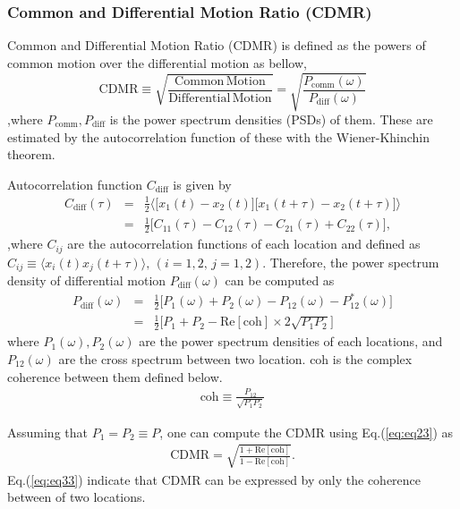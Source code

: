 \documentclass[a4paper,12pt]{book}
\begin{document}
\subsubsection{Common and Differential Motion Ratio (CDMR)}
Common and Differential Motion Ratio (CDMR) is defined as the powers of common motion over the differential motion as bellow,
\begin{equation}
  \mathrm{CDMR} \equiv \sqrt{\frac{\mathrm{Common\,Motion}}{\mathrm{Differential\,Motion}}} = \sqrt{\frac{P_{\mathrm{comm}}(\omega)}{P_{\mathrm{diff}}(\omega)}} \label{eq:eq23}
\end{equation}
,where $P_{\mathrm{comm}},P_{\mathrm{diff}}$ is the power spectrum densities (PSDs) of them. These are estimated by the autocorrelation function of these with the Wiener-Khinchin theorem.

Autocorrelation function $C_{\mathrm{diff}}$ is given by
\begin{eqnarray}
  C_{\mathrm{diff}}(\tau) &=& \frac{1}{2}
  \biggl\langle
  \biggl[ x_{1}(t)-x_{2}(t) \biggr] \biggl[ x_{1}(t+\tau)-x_{2}(t+\tau) \biggr]
  \biggr\rangle \\
  &=& \frac{1}{2}\biggl[ C_{11}(\tau) - C_{12}(\tau) - C_{21}(\tau) + C_{22}(\tau) \biggr], 
\end{eqnarray}
,where $C_{ij}$ are the autocorrelation functions of each location and defined as $ C_{ij} \equiv \langle x_{i}(t)x_{j}(t+\tau)\rangle,\, (i=1,2,\,j=1,2)$. Therefore, the power spectrum density of differential motion $P_{\mathrm{diff}}(\omega)$ can be computed as
\begin{eqnarray}
  P_{\mathrm{diff}}(\omega) &=& \frac{1}{2}\biggl[ P_{1}(\omega) + P_{2}(\omega) - P_{12}(\omega) - P_{12}^*(\omega) \biggr]\\
  &=& \frac{1}{2} \biggl[ P_{1}+P_{2} - \mathrm{Re}\left[\mathrm{coh} \right]\times2\sqrt{P_{1}P_{2}} \biggr] \label{eq:eq31}
\end{eqnarray}
where $P_{1}(\omega),P_{2}(\omega)$ are the power spectrum densities of each locations, and $P_{12}(\omega)$ are the cross spectrum between two location. $\mathrm{coh}$ is the complex coherence between them defined below.
\begin{eqnarray}
  \mathrm{coh} \equiv \frac{P_{12}}{\sqrt{P_{1}P_{2}}}
\end{eqnarray}

Assuming that $P_{1}=P_{2} \equiv P$, one can compute the CDMR using Eq.(\ref{eq:eq23}) as
\begin{eqnarray}
 \mathrm{CDMR} = \sqrt{\frac{1 + \mathrm{Re} \left[\mathrm{coh} \right] }{1 - \mathrm{Re} \left[\mathrm{coh} \right]}}. \label{eq:eq33}
\end{eqnarray}
Eq.(\ref{eq:eq33}) indicate that CDMR can be expressed by only the coherence between of two locations.
\end{document}
